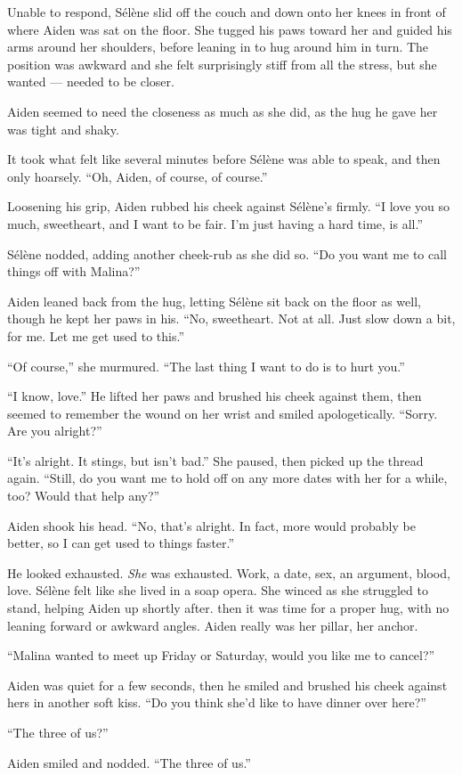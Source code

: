 Unable to respond, Sélène slid off the couch and down onto her knees in front of where Aiden was sat on the floor. She tugged his paws toward her and guided his arms around her shoulders, before leaning in to hug around him in turn. The position was awkward and she felt surprisingly stiff from all the stress, but she wanted --- needed to be closer.

Aiden seemed to need the closeness as much as she did, as the hug he gave her was tight and shaky.

It took what felt like several minutes before Sélène was able to speak, and then only hoarsely. ``Oh, Aiden, of course, of course.''

Loosening his grip, Aiden rubbed his cheek against Sélène's firmly. ``I love you so much, sweetheart, and I want to be fair. I'm just having a hard time, is all.''

Sélène nodded, adding another cheek-rub as she did so. ``Do you want me to call things off with Malina?''

Aiden leaned back from the hug, letting Sélène sit back on the floor as well, though he kept her paws in his. ``No, sweetheart. Not at all. Just slow down a bit, for me. Let me get used to this.''

``Of course,'' she murmured. ``The last thing I want to do is to hurt you.''

``I know, love.'' He lifted her paws and brushed his cheek against them, then seemed to remember the wound on her wrist and smiled apologetically. ``Sorry. Are you alright?''

``It's alright. It stings, but isn't bad.'' She paused, then picked up the thread again. ``Still, do you want me to hold off on any more dates with her for a while, too? Would that help any?''

Aiden shook his head. ``No, that's alright. In fact, more would probably be better, so I can get used to things faster.''

He looked exhausted. \emph{She} was exhausted. Work, a date, sex, an argument, blood, love. Sélène felt like she lived in a soap opera. She winced as she struggled to stand, helping Aiden up shortly after. then it was time for a proper hug, with no leaning forward or awkward angles. Aiden really was her pillar, her anchor.

``Malina wanted to meet up Friday or Saturday, would you like me to cancel?''

Aiden was quiet for a few seconds, then he smiled and brushed his cheek against hers in another soft kiss. ``Do you think she'd like to have dinner over here?''

``The three of us?''

Aiden smiled and nodded. ``The three of us.''

